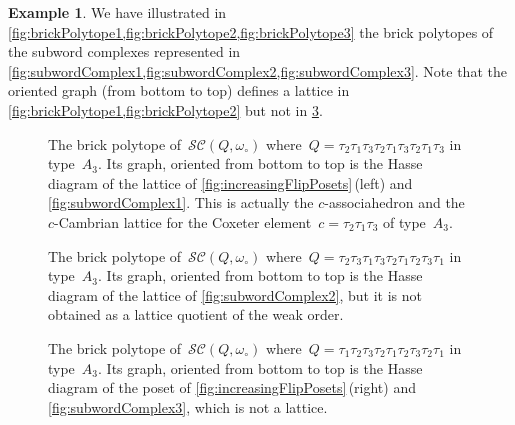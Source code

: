 \documentclass[reqno]{amsart}
\theoremstyle{definition}
\newtheorem{example}[theorem]{Example}
\newcommand{\wo}{\omega_\circ} %
\newcommand{\subwordComplex}{\mathcal{SC}} %
\begin{document}
\begin{example}
We have illustrated in \cref{fig:brickPolytope1,fig:brickPolytope2,fig:brickPolytope3} the brick polytopes of the subword complexes represented in \cref{fig:subwordComplex1,fig:subwordComplex2,fig:subwordComplex3}.
Note that the oriented graph (from bottom to top) defines a lattice in \cref{fig:brickPolytope1,fig:brickPolytope2} but not in \cref{fig:brickPolytope3}.
%
\begin{figure}[p]
	\centerline{}
	\caption{The brick polytope of~$\subwordComplex(Q,\wo)$ where~$Q = \tau_2 \tau_1 \tau_3 \tau_2 \tau_1 \tau_3 \tau_2 \tau_1 \tau_3$ in type~$A_3$. Its graph, oriented from bottom to top is the Hasse diagram of the lattice of \cref{fig:increasingFlipPosets}\,(left) and \cref{fig:subwordComplex1}. This is actually the $c$-associahedron and the $c$-Cambrian lattice for the Coxeter element~$c = \tau_2\tau_1\tau_3$ of type~$A_3$.}
	\label{fig:brickPolytope1}
\end{figure}
%
\begin{figure}[p]
	\centerline{}
	\caption{The brick polytope of~$\subwordComplex(Q,\wo)$ where~$Q = \tau_2 \tau_3 \tau_1 \tau_3 \tau_2 \tau_1 \tau_2 \tau_3 \tau_1$ in type~$A_3$. Its graph, oriented from bottom to top is the Hasse diagram of the lattice of \cref{fig:subwordComplex2}, but it is not obtained as a lattice quotient of the weak order.}
	\label{fig:brickPolytope2}
\end{figure}
%
\begin{figure}[p]
	\centerline{}
	\caption{The brick polytope of~$\subwordComplex(Q,\wo)$ where~$Q = \tau_1 \tau_2 \tau_3 \tau_2 \tau_1 \tau_2 \tau_3 \tau_2 \tau_1$ in type~$A_3$. Its graph, oriented from bottom to top is the Hasse diagram of the poset of \cref{fig:increasingFlipPosets}\,(right) and \cref{fig:subwordComplex3}, which is not a lattice.}
	\label{fig:brickPolytope3}
\end{figure}
\end{example}

\end{document}
